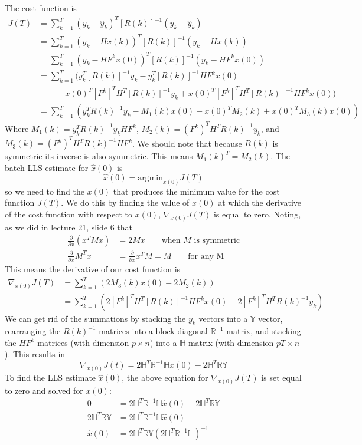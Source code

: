 \documentclass[11pt]{article}
\begin{document}
\subparagraph*{}
The cost function is
\begin{align*}
	J(T) &= \sum_{k=1}^T(y_k-\hat{y}_k)^T[R(k)]^{-1}(y_k-\hat{y}_k) \\
	&= \sum_{k=1}^T(y_k-Hx(k))^T[R(k)]^{-1}(y_k-Hx(k)) \\
	&= \sum_{k=1}^T(y_k-HF^kx(0))^T[R(k)]^{-1}(y_k-HF^kx(0)) \\
	&= \sum_{k=1}^T \Big(y_k^T[R(k)]^{-1}y_k - y_k^T[R(k)]^{-1}HF^kx(0) \\
	&\qquad-x(0)^T[F^k]^TH^T[R(k)]^{-1}y_k + x(0)^T[F^k]^TH^T[R(k)]^{-1}HF^kx(0) \Big) \\
	&= \sum_{k=1}^T (y_k^TR(k)^{-1}y_k - M_1(k)x(0) - x(0)^TM_2(k)+x(0)^TM_3(k)x(0))
\end{align*}
Where $M_1(k) = y_k^TR(k)^{-1}y_kHF^k$, $M_2(k) = (F^k)^TH^TR(k)^{-1}y_k$, and $M_3(k)=(F^k)^TH^TR(k)^{-1}HF^k$. We should note that because $R(k)$ is symmetric its inverse is also symmetric. This means $M_1(k)^T=M_2(k)$. The batch LLS estimate for $\hat{x}(0)$ is
\begin{equation*}
	\hat{x}(0) = \text{argmin}_{x(0)}J(T)
\end{equation*}
so we need to find the $x(0)$ that produces the minimum value for the cost function $J(T)$. We do this by finding the value of $x(0)$ at which the derivative of the cost function with respect to $x(0)$, $\nabla_{x(0)}J(T)$ is equal to zero. Noting, as we did in lecture 21, slide 6 that 
\begin{align*}
	\frac{\partial}{\partial x}(x^TMx) &= 2Mx \qquad \text{when $M$ is symmetric}\\ 
	\frac{\partial}{\partial x}M^Tx &= \frac{\partial}{\partial x}x^TM = M \qquad \text{for any M}
\end{align*}
This means the derivative of our cost function is
\begin{align*}
	\nabla_{x(0)}J(T) &= \sum_{k=1}^T (2M_3(k)x(0)-2M_2(k)) \\
	&= \sum_{k=1}^T (2[F^k]^TH^T[R(k)]^{-1}HF^kx(0)-2[F^k]^TH^TR(k)^{-1}y_k)
\end{align*}
We can get rid of the summations by stacking the $y_k$ vectors into a $\mathbb{Y}$ vector, rearranging the $R(k)^{-1}$ matrices into a block diagonal $\mathbb{R}^{-1}$ matrix, and stacking the $HF^k$ matrices (with dimension $p\times n$) into a $\mathbb{H}$ matrix (with dimension $pT\times n$). This results in 
\begin{equation*}
	\nabla_{x(0)}J(t) = 2\mathbb{H}^T\mathbb{R}^{-1}\mathbb{H}x(0) - 2\mathbb{H}^T\mathbb{R}\mathbb{Y}
\end{equation*}
To find the LLS estimate $\hat{x}(0)$, the above equation for $\nabla_{x(0)}J(T)$ is set equal to zero and solved for $x(0)$:
\begin{align*}
	0 &= 2\mathbb{H}^T\mathbb{R}^{-1}\mathbb{H}\hat{x}(0)-2\mathbb{H}^T\mathbb{R}\mathbb{Y} \\
	2\mathbb{H}^T\mathbb{R}\mathbb{Y} &= 2\mathbb{H}^T\mathbb{R}^{-1}\mathbb{H}\hat{x}(0) \\
	\hat{x}(0) &= 2\mathbb{H}^T\mathbb{R}\mathbb{Y}(2\mathbb{H}^T\mathbb{R}^{-1}\mathbb{H})^{-1}
\end{align*}
\end{document}
